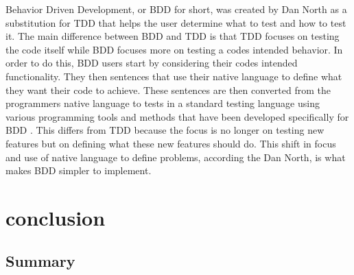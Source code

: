 \documentclass{sig-alternate}
\begin{document}

Behavior Driven Development, or BDD for short, was created by Dan North as a substitution for TDD that helps the user determine what to test and how to test it.  The main difference between BDD and TDD is that TDD focuses on testing the code itself while BDD focuses more on testing a codes intended behavior. In order to do this, BDD users start by considering their codes intended functionality.  They then sentences that use their native language to define what they want their code to achieve.  These sentences are then converted from the programmers native language to tests in a standard testing language using various programming tools and methods that have been developed specifically for BDD \cite{Soeken:2012, North:xxx, Hammond:2012}. This differs from TDD because the focus is no longer on testing new features but on defining what these new features should do.  This shift in focus and use of native language to define problems, according the Dan North, is what makes BDD simpler to implement. \cite{North:xxx}

\section{conclusion}
\subsection{Summary}
\end{document}
